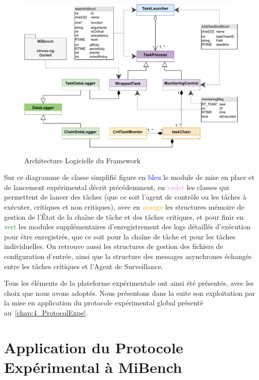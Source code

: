 \documentclass[french, a4paper, 11pt, twoside, pdftex]{StyleThese}
\begin{document}
	\begin{figure}[ht]
		\centering
		\includegraphics[width=\linewidth]{schemas/Implementation_DiagrammeDeClasse}
		\caption{Architecture Logicielle du Framework}
		\label{fig:implementationdiagrammedeclasse}
	\end{figure}
    
    Sur ce diagramme de classe simplifié figure en \textcolor{blue}{bleu} le module de mise en place et de lancement expérimental décrit précédemment, en \textcolor{violet}{violet} les classes qui permettent de lancer des tâches (que ce soit l'agent de contrôle ou les tâches à exécuter, critiques et non critiques), avec en \textcolor{orange}{orange} les structures mémoire de gestion de l'État de la chaîne de tâche et des tâches critiques, et pour finir en \textcolor{ForestGreen}{vert} les modules supplémentaires d'enregistrement des logs détaillés d'exécution pour être enregistrés, que ce soit pour la chaîne de tâche et pour les tâches individuelles. On retrouve aussi les structures de gestion des fichiers de configuration d'entrée, ainsi que la structure des messages asynchrones échangés entre les tâches critiques et l'Agent de Surveillance.
    
	Tous les éléments de la plateforme expérimentale ont ainsi été présentés, avec les choix que nous avons adoptés. Nous présentons dans la suite son exploitation par la mise en application du protocole expérimental global présenté au~\autoref{chap:4_ProtocolExpe}.
    	
\section{Application du Protocole Expérimental à MiBench}
\end{document}
